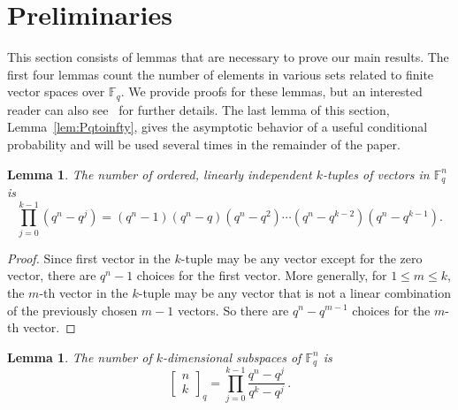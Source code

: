 \documentclass[3p,times]{elsarticle}
\newtheorem{lemma}[theorem]{Lemma}
\theoremstyle{remark}
\newcommand{\qbin}[2]{\begin{bmatrix}{#1}\\ {#2}\end{bmatrix}_q}
\newcommand\Fqn[1]{\mathbb{F}_q^{#1}}
\begin{document}
\section{Preliminaries}
This section consists of lemmas that are necessary to prove our main results.
The first four lemmas count the number of elements in various sets related to
finite vector spaces over $\mathbb{F}_q$.  We provide
proofs for these lemmas, but an interested reader can also
see~\cite{stanley2011enumerative} for further details. The last lemma of 
this section, Lemma~\ref{lem:Pqtoinfty}, gives the asymptotic behavior of a useful
conditional probability and will be used several times in the remainder of the
paper.

\begin{lemma}\label{NumkTup}
  The number of ordered, linearly independent $k$-tuples of vectors in $\Fqn{n}$  is
\[
\prod_{j=0}^{k-1} \left(q^n - q^j\right) = 
(q^n-1)(q^n-q)(q^n-q^2)\cdots(q^n - q^{k-2})(q^n-q^{k-1}).
\]
\end{lemma}

\begin{proof}
Since first vector in the $k$-tuple may be any vector except for the zero
vector, there are $q^n-1$ choices for the first vector.  More generally, for $1
\leq m \leq k$, the
$m$-th vector in the $k$-tuple may be any vector that is not a linear
combination of the previously chosen $m-1$ vectors. So there are $q^n -
q^{m-1}$ choices for the $m$-th vector.
\end{proof}

\begin{lemma}\label{NumkSub}
  The number of $k$-dimensional subspaces of $\Fqn{n}$ is
\[
  \qbin{n}{k} = \prod_{j=0}^{k-1} \frac{q^n-q^j}{q^k-q^j} \, .
\]
\end{lemma}
\end{document}
